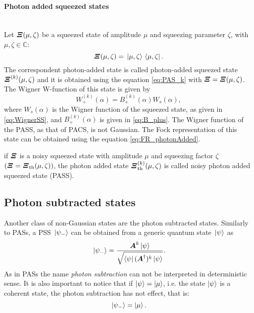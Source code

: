         \paragraph{Photon added squeezed states}\mbox{}\\
        \label{PASSs}
        Let $\bm{\relax{\varXi}}(\mu,\zeta)$ be a squeezed state of amplitude $\mu$ and squeezing parameter $\zeta$,
        with $\mu,\zeta \in \mathbb{C}$:
        \begin{equation*}
            \bm{\relax{\varXi}}(\mu,\zeta)=\ket*{\mu,\zeta}\bra*{\mu,\zeta}.
        \end{equation*}
        The correspondent photon-added state is called photon-added squeezed state $\bm{\relax{\varXi}}^{(k)}(\mu,\zeta)$ and it is obtained 
        using the equation \ref{eq:PAS_k} with $\bm{\relax{\varXi}}=\bm{\relax{\varXi}}(\mu,\zeta)$.
        The Wigner W-function of this state is given by
        \begin{equation}
            W_+^{(k)}(\alpha) = B_+^{(k)}(\alpha) W_s(\alpha),
        \end{equation}
        where $W_s(\alpha)$ is the Wigner function of the squeezed state, as given in 
        \ref{eq:WignerSS}, and $B_+^{(k)}(\alpha)$ is 
        given in \ref{eq:B_plus}.
        The Wigner function of the PASS, as that of PACS, is not Gaussian.
        The Fock representation of this state can be obtained using the equation \ref{eq:FR_photonAdded}.

        if $\bm{\relax{\varXi}}$ is a noisy squeezed state with amplitude $\mu$ and squeezing factor 
        $\zeta$ $(\bm{\relax{\varXi}}=\bm{\relax{\varXi}}_{\mathrm{th}}(\mu,\zeta))$, the photon added state 
        $\bm{\relax{\varXi}}_{\mathrm{th}}^{(k)}(\mu,\zeta)$ is called noisy photon added squeezed state 
        (PASS).

    \subsection{Photon subtracted states}
        Another class of non-Gaussian states are the photon subtracted states. Similarly to PASs, a PSS 
        $\ket*{\psi_-}$ can be obtained from a generic quantum state $\ket*{\psi}$ as
        \begin{equation}
            \ket*{\psi_-} = \frac{\bm{\relax{A}}^k \ket{\psi}}{\sqrt{\bra{\psi}(\bm{\relax{A}}^\dagger)^k\ket{\psi}}}.
        \end{equation}
        As in PASs the name \emph{photon subtraction} can not be interpreted in deterministic sense.
        It is also important to notice that if $\ket{\psi}=\ket{\mu}$, i.e. the state $\ket{\psi}$ is 
        a coherent state, the photon subtraction has not effect, that is:
        \begin{equation*}
            \ket*{\psi_-}=\ket{\mu}.
        \end{equation*}
